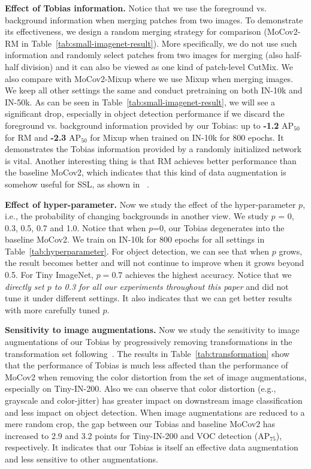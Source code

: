 \documentclass[letterpaper]{article} %
\begin{document}
\textbf{Effect of Tobias information.} Notice that we use the foreground vs. background information when merging patches from two images. To demonstrate its effectiveness, we design a random merging strategy for comparison (MoCov2-RM in Table~\ref{tab:small-imagenet-result}). More specifically, we do not use such information and randomly select patches from two images for merging (also half-half division) and it can also be viewed as one kind of patch-level CutMix. We also compare with MoCov2-Mixup where we use Mixup when merging images. We keep all other settings the same and conduct pretraining on both IN-10k and IN-50k. As can be seen in Table~\ref{tab:small-imagenet-result}, we will see a significant drop, especially in object detection performance if we discard the foreground vs. background information provided by our Tobias: up to \textbf{-1.2} $\text{AP}_{50}$ for RM and \textbf{-2.3} $\text{AP}_{50}$ for Mixup when trained on IN-10k for 800 epochs. It demonstrates the Tobias information provided by a randomly initialized network is vital. Another interesting thing is that RM achieves better performance than the baseline MoCov2, which indicates that this kind of data augmentation is somehow useful for SSL, as shown in ~\citep{unmix:shen:arxiv20}.   

\textbf{Effect of hyper-parameter.} Now we study the effect of the hyper-parameter $p$, i.e., the probability of changing backgrounds in another view. We study $p$ = 0, 0.3, 0.5, 0.7 and 1.0. Notice that when $p$=0, our Tobias degenerates into the baseline MoCov2. We train on IN-10k for 800 epochs for all settings in Table~\ref{tab:hyperparameter}. For object detection, we can see that when $p$ grows, the result becomes better and will not continue to improve when it grows beyond 0.5. For Tiny ImageNet, $p=0.7$ achieves the highest accuracy. Notice that we \emph{directly set $p$ to 0.3 for all our experiments throughout this paper} and did not tune it under different settings. It also indicates that we can get better results with more carefully tuned $p$.



\textbf{Sensitivity to image augmentations.} Now we study the sensitivity to image augmentations of our Tobias by progressively removing transformations in the transformation set following~\citet{byol:grill:NIPS20}. The results in Table~\ref{tab:transformation} show that the performance of Tobias is much less affected than the performance of MoCov2 when removing the color distortion from the set of image augmentations, especially on Tiny-IN-200. Also we can observe that color distortion (e.g., grayscale and color-jitter) has greater impact on downstream image classification and less impact on object detection. When image augmentations are reduced to a mere random crop, the gap between our Tobias and baseline MoCov2 has increased to 2.9 and 3.2 points for Tiny-IN-200 and VOC detection ($\text{AP}_{75}$), respectively. It indicates that our Tobias is itself an effective data augmentation and less sensitive to other augmentations.
\end{document}
